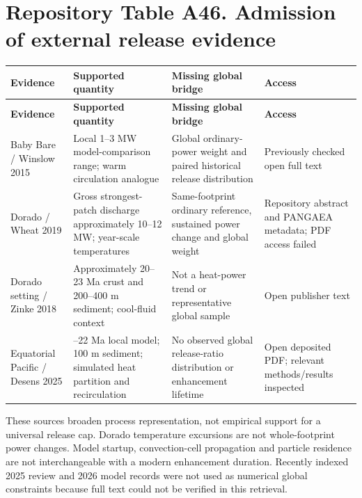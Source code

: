 \documentclass[11pt,a4paper]{article}
\begin{document}
\section*{Repository Table A46. Admission of external release evidence}
{\fontsize{8.3}{10.1}\selectfont\begin{longtable}{>{\raggedright\arraybackslash}p{32.307mm}>{\raggedright\arraybackslash}p{45.229mm}>{\raggedright\arraybackslash}p{51.691mm}>{\raggedright\arraybackslash}p{32.307mm}}\toprule
\textbf{Evidence} & \textbf{Supported quantity} & \textbf{Missing global bridge} & \textbf{Access}\\\midrule\endfirsthead
\textbf{Evidence} & \textbf{Supported quantity} & \textbf{Missing global bridge} & \textbf{Access}\\\midrule\endhead
\bottomrule\endfoot
Baby Bare /\allowbreak{} Winslow 2015 & Local 1--3 MW model-comparison range; warm circulation analogue & Global ordinary-power weight and paired historical release distribution & Previously checked open full text\\
Dorado /\allowbreak{} Wheat 2019 & Gross strongest-patch discharge approximately 10--12 MW; year-scale temperatures & Same-footprint ordinary reference, sustained power change and global weight & Repository abstract and PANGAEA metadata; PDF access failed\\
Dorado setting /\allowbreak{} Zinke 2018 & Approximately 20--23 Ma crust and 200--400 m sediment; cool-fluid context & Not a heat-power trend or representative global sample & Open publisher text\\
Equatorial Pacific /\allowbreak{} Desens 2025 & 18--22 Ma local model; 100 m sediment; simulated heat partition and recirculation & No observed global release-ratio distribution or enhancement lifetime & Open deposited PDF; relevant methods/\allowbreak{}results inspected\\
\end{longtable}}
These sources broaden process representation, not empirical support for a universal release cap. Dorado temperature excursions are not whole-footprint power changes. Model startup, convection-cell propagation and particle residence are not interchangeable with a modern enhancement duration. Recently indexed 2025 review and 2026 model records were not used as numerical global constraints because full text could not be verified in this retrieval.\par
\clearpage
\end{document}
